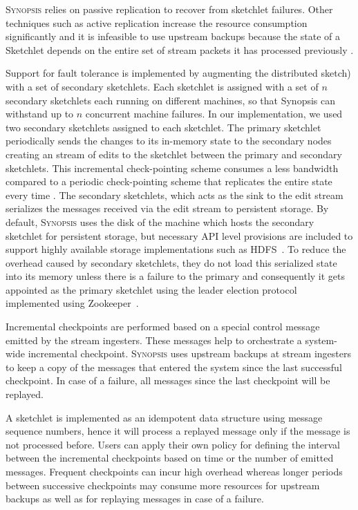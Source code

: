 \textsc{Synopsis} relies on passive replication to recover from sketchlet failures.
Other techniques such as active replication increase the resource consumption significantly and it is infeasible to use upstream backups because the state of a Sketchlet depends on the entire set of stream packets it has processed previously \cite{castro2013integrating}.

Support for fault tolerance is implemented by augmenting the distributed sketch) with a set of secondary sketchlets.
Each sketchlet is assigned with a set of $n$ secondary sketchlets each running on different machines, so that Synopsis can withstand up to $n$ concurrent machine failures.
In our implementation, we used two secondary sketchlets assigned to each sketchlet.
The primary sketchlet periodically sends the changes to its in-memory state to the secondary nodes creating an stream of edits to the sketchlet between the primary and secondary sketchlets.
This incremental check-pointing scheme consumes a less bandwidth compared to a periodic check-pointing scheme that replicates the entire state every time \cite{castro2013integrating}.
The secondary sketchlets, which acts as the sink to the edit stream serializes the messages received via the edit stream to persistent storage.
By default, \textsc{Synopsis} uses the disk of the machine which hosts the secondary sketchlet for persistent storage, but necessary API level provisions are included to support highly available storage implementations such as HDFS~\cite{borthakur2008hdfs}.
To reduce the overhead caused by secondary sketchlets, they do not load this serialized state into its memory unless there is a failure to the primary and consequently it gets appointed as the primary sketchlet using the leader election protocol implemented using Zookeeper~\cite{hunt2010zookeeper}.

Incremental checkpoints are performed based on a special control message emitted by the stream ingesters.
These messages help to orchestrate a system-wide incremental checkpoint.
\textsc{Synopsis} uses upstream backups at stream ingesters to keep a copy of the messages that entered the system since the last successful checkpoint.
In case of a failure, all messages since the last checkpoint will be replayed.

A sketchlet is implemented as an idempotent data structure using message sequence numbers, hence it will process a replayed message only if the message is not processed before.
Users can apply their own policy for defining the interval between the incremental checkpoints based on time or the number of emitted messages.
Frequent checkpoints can incur high overhead whereas longer periods between successive checkpoints may consume more resources for upstream backups as well as for replaying messages in case of a failure.

